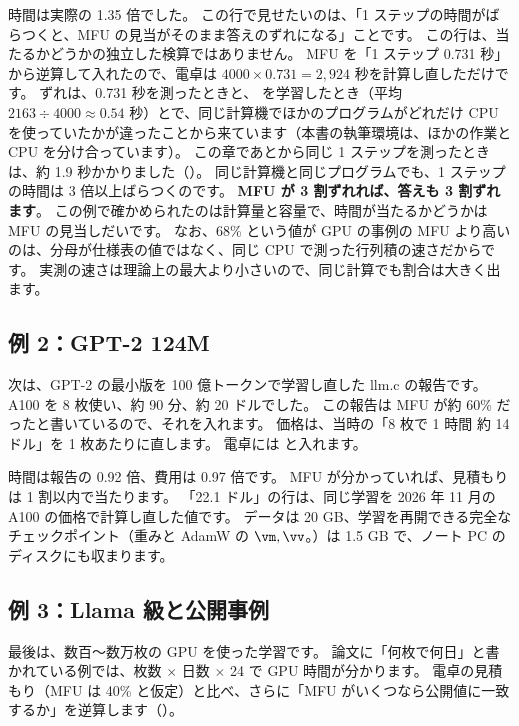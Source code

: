 時間は実際の 1.35 倍でした。
この行で見せたいのは、「1 ステップの時間がばらつくと、MFU の見当がそのまま答えのずれになる」ことです。
この行は、当たるかどうかの独立した検算ではありません。
MFU を「1 ステップ 0.731 秒」から逆算して入れたので、電卓は $4000\times0.731=2{,}924$ 秒を計算し直しただけです。
ずれは、0.731 秒を測ったときと、 を学習したとき（平均 $2163\div4000\approx0.54$ 秒）とで、同じ計算機でほかのプログラムがどれだけ CPU を使っていたかが違ったことから来ています（本書の執筆環境は、ほかの作業と CPU を分け合っています）。
この章であとから同じ 1 ステップを測ったときは、約 1.9 秒かかりました（）。
同じ計算機と同じプログラムでも、1 ステップの時間は 3 倍以上ばらつくのです。
\textbf{MFU が 3 割ずれれば、答えも 3 割ずれます}。
この例で確かめられたのは計算量と容量で、時間が当たるかどうかは MFU の見当しだいです。
なお、68\% という値が GPU の事例の MFU より高いのは、分母が仕様表の値ではなく、同じ CPU で測った行列積の速さだからです。
実測の速さは理論上の最大より小さいので、同じ計算でも割合は大きく出ます。

\subsection*{例 2：GPT-2 124M}

次は、GPT-2 の最小版を 100 億トークンで学習し直した llm.c の報告です\cite{karpathy2024llmc}。
A100 を 8 枚使い、約 90 分、約 20 ドルでした。
この報告は MFU が約 60\% だったと書いているので、それを入れます。
価格は、当時の「8 枚で 1 時間 約 14 ドル」を 1 枚あたりに直します。
電卓には  と入れます。


時間は報告の 0.92 倍、費用は 0.97 倍です。
MFU が分かっていれば、見積もりは 1 割以内で当たります。
「22.1 ドル」の行は、同じ学習を 2026 年 11 月の A100 の価格で計算し直した値です。
データは 20 GB、学習を再開できる完全なチェックポイント（重みと AdamW の $\vm,\vv$。）は 1.5 GB で、ノート PC のディスクにも収まります。

\subsection*{例 3：Llama 級と公開事例}

最後は、数百〜数万枚の GPU を使った学習です。
論文に「何枚で何日」と書かれている例では、枚数 $\times$ 日数 $\times$ 24 で GPU 時間が分かります。
電卓の見積もり（MFU は 40\% と仮定）と比べ、さらに「MFU がいくつなら公開値に一致するか」を逆算します（）。

